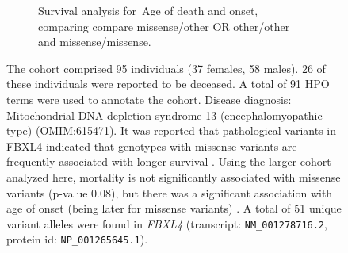 \begin{figure}[htbp]\ContinuedFloat
\begin{subfigure}[b]{0.95\textwidth}
\captionsetup{justification=raggedright,singlelinecheck=false}
\caption{Survival analysis for Age of death and onset, comparing compare missense/other OR other/other and missense/missense. }
\end{subfigure}


\caption{The cohort comprised 95 individuals (37 females, 58 males). 26 of these individuals were reported to be deceased. 
A total of 91 HPO terms were used to annotate the cohort. Disease diagnosis: Mitochondrial DNA depletion syndrome 13 (encephalomyopathic type)
 (OMIM:615471). It was reported that pathological variants in FBXL4 indicated that genotypes with 
 missense variants are frequently associated with longer survival \cite{PMID_28940506}. 
 Using the larger cohort analyzed here, mortality is not significantly associated with 
 missense variants (p-value 0.08), but there was a significant association with age of onset (being later for missense variants) \cite{PMID_28940506}.
 A total of 51 unique variant alleles were found in \textit{FBXL4} (transcript: \texttt{NM\_001278716.2}, protein id: \texttt{NP\_001265645.1}).}
\end{figure}
